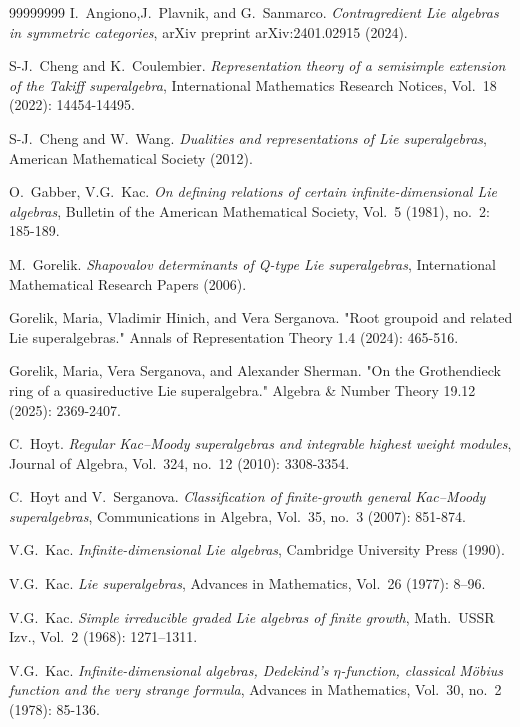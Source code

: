 \documentclass[12pt, a4paper, reqno]{amsart}
\theoremstyle{definition}
\theoremstyle{definition}
\theoremstyle{definition}
\numberwithin{theorem}{section}
\numberwithin{lemma}{section}
\numberwithin{remark}{section}
\numberwithin{definition}{section}
\numberwithin{corollary}{section}
\numberwithin{proposition}{section}
\numberwithin{example}{section}
\begin{document}
	\begin{thebibliography}{99999999}
		 I.~Angiono,J.~Plavnik, and G.~Sanmarco. \emph{Contragredient Lie algebras in symmetric categories}, arXiv preprint arXiv:2401.02915 (2024).		
		
		 S-J.~Cheng and K.~Coulembier. \emph{Representation theory of a semisimple extension of the Takiff superalgebra}, International Mathematics Research Notices, Vol.~18 (2022): 14454-14495.
		
		 S-J.~Cheng and W.~Wang. \textit{Dualities and representations of Lie superalgebras}, American Mathematical Society (2012).
		
		 O.~Gabber, V.G.~Kac.  \emph{On defining relations of certain infinite-dimensional Lie algebras}, Bulletin of the American Mathematical Society, Vol.~5 (1981), no.~2: 185-189.
		
		 M.~Gorelik. \textit{Shapovalov determinants of Q-type Lie superalgebras}, International Mathematical Research Papers (2006).
		
		 Gorelik, Maria, Vladimir Hinich, and Vera Serganova. "Root groupoid and related Lie superalgebras." Annals of Representation Theory 1.4 (2024): 465-516.
		
		 Gorelik, Maria, Vera Serganova, and Alexander Sherman. "On the Grothendieck ring of a quasireductive Lie superalgebra." Algebra \& Number Theory 19.12 (2025): 2369-2407.
		
		 C.~Hoyt. \emph{Regular Kac–Moody superalgebras and integrable highest weight modules}, Journal of Algebra, Vol.~324, no.~12 (2010): 3308-3354.
		
		 C.~Hoyt and V.~Serganova. \emph{Classification of finite-growth general Kac–Moody superalgebras}, Communications in Algebra, Vol.~35, no.~3 (2007): 851-874.
		
		 V.G.~Kac. \textit{Infinite-dimensional Lie algebras}, Cambridge University Press (1990).
		
		 V.G.~Kac. \textit{Lie superalgebras}, Advances in Mathematics, Vol.~26 (1977): 8--96.
		
		 V.G.~Kac. \textit{Simple irreducible graded Lie algebras of finite growth}, Math.~USSR Izv., Vol.~2 (1968): 1271--1311.
		
		 V.G.~Kac. \emph{Infinite-dimensional algebras, Dedekind's $\eta$-function, classical Möbius function and the very strange formula}, Advances in Mathematics, Vol.~30, no.~2 (1978): 85-136.
		

\end{thebibliography}
\end{document}
